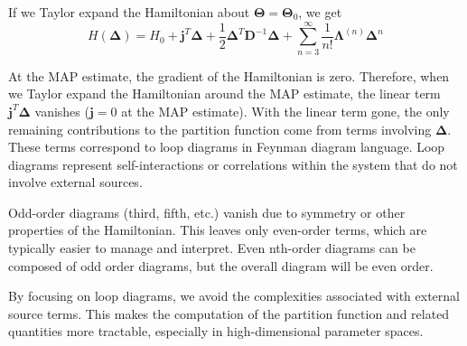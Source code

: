 \documentclass[letterpaper,12pt]{article}
\begin{document}
If we Taylor expand the Hamiltonian about $\bm{\Theta} = \bm{\Theta}_{0}$, we get
\begin{equation}
    H(\bm{\Delta}) = H_{0} + \bm{j}^{T}\bm{\Delta} + \frac{1}{2}\bm{\Delta}^{T}\bm{D}^{-1}\bm{\Delta} + \sum_{n=3}^{\infty} \frac{1}{n!}\bm{\Lambda}^{(n)}\bm{\Delta}^{n}
\end{equation}

At the MAP estimate, the gradient of the Hamiltonian is zero. Therefore, when we Taylor expand the Hamiltonian around the MAP estimate, the linear term $\bm{j}^{T}\bm{\Delta}$ vanishes ($\bm{j} = 0$ at the MAP estimate).
With the linear term gone, the only remaining contributions to the partition function come from terms involving $\bm{\Delta}$.
These terms correspond to loop diagrams in Feynman diagram language. 
Loop diagrams represent self-interactions or correlations within the system that do not involve external sources.

Odd-order diagrams (third, fifth, etc.) vanish due to symmetry or other properties of the Hamiltonian. 
This leaves only even-order terms, which are typically easier to manage and interpret.
Even nth-order diagrams can be composed of odd order diagrams, but the overall diagram will be even order.

By focusing on loop diagrams, we avoid the complexities associated with external source terms. This makes the computation of the partition function and related quantities more tractable, especially in high-dimensional parameter spaces.
\end{document}
